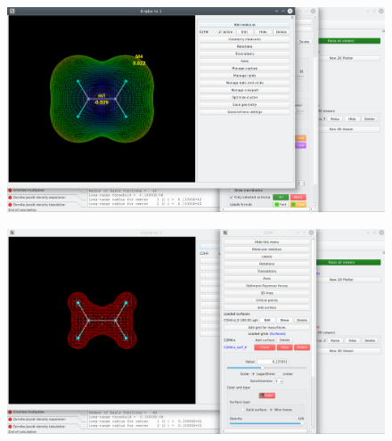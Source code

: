 \documentclass[a4paper,10pt]{article}
\begin{document}
\begin{minipage}{.5\linewidth}
\begin{figure}[H]
\caption{\label{fig:47}}
\begin{center}
\includegraphics[width=0.95\linewidth]{damqt_QS_fig47.png}
\end{center}
\end{figure} 
\end{minipage}
\begin{minipage}{.5\linewidth}
\begin{figure}[H]
\caption{\label{fig:48}}
\begin{center}
\includegraphics[width=0.95\linewidth]{damqt_QS_fig48.png}
\end{center}
\end{figure} 
\end{minipage}
\end{document}
